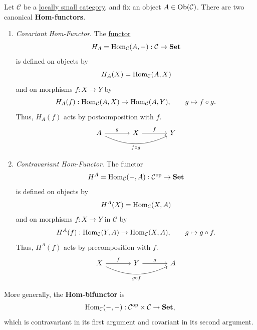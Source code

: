 	\begin{definition}
	  \label{def:hom-functors}
		Let $\mathcal C$ be a \hyperref[def:locally-small-category]{locally small category},
		and fix an object $A \in \operatorname{Ob}(\mathcal C)$.
		There are two canonical \textbf{Hom-functors}.
		\begin{enumerate}
			\item \textit{Covariant Hom-Functor}. The \hyperref[def:functor]{functor}
				\begin{equation}
					H_A = \operatorname{Hom}_{\mathcal C}(A,-):
					\mathcal C \to \operatorname{\mathbf{Set}}
				\end{equation}
				is defined on objects by
				\begin{equation}
					H_A(X) = \operatorname{Hom}_{\mathcal C}(A,X)
				\end{equation}
				and on morphisms $f: X \to Y$ by
				\begin{equation}
					H_A(f): \operatorname{Hom}_{\mathcal C}(A,X)
					\to \operatorname{Hom}_{\mathcal C}(A,Y),
					\qquad g \mapsto f \circ g.
				\end{equation}
				Thus, $H_A(f)$ acts by postcomposition with $f$.
				\begin{equation}
					\begin{tikzcd}[column sep=large]
						A \arrow[r, "g"]
							\arrow[rr, bend right=25, "f\circ g"'] &
						X \arrow[r, "f"] & Y
					\end{tikzcd}
				\end{equation}

			\item \textit{Contravariant Hom-Functor}. The functor
				\begin{equation}
					H^A = \operatorname{Hom}_{\mathcal C}(-,A):
					\mathcal C^{\mathrm{op}} \to \operatorname{\mathbf{Set}}
				\end{equation}
				is defined on objects by
				\begin{equation}
					H^A(X) = \operatorname{Hom}_{\mathcal C}(X,A)
				\end{equation}
				and on morphisms $f: X \to Y$ in $\mathcal C$ by
				\begin{equation}
					H^A(f): \operatorname{Hom}_{\mathcal C}(Y,A)
					\to \operatorname{Hom}_{\mathcal C}(X,A),
					\qquad g \mapsto g \circ f.
				\end{equation}
				Thus, $H^A(f)$ acts by precomposition with $f$.
				\begin{equation}
					\begin{tikzcd}[column sep=large]
						X \arrow[r, "f"]
							\arrow[rr, bend right=25, "g\circ f"'] &
						Y \arrow[r, "g"] & A
					\end{tikzcd}
				\end{equation}
		\end{enumerate}

		More generally, the \textbf{Hom-bifunctor} is
		\begin{equation}
			\operatorname{Hom}_{\mathcal C}(-,-):
			\mathcal C^{\mathrm{op}} \times \mathcal C
			\to \operatorname{\mathbf{Set}},
		\end{equation}
		which is contravariant in its first argument
		and covariant in its second argument.
	\end{definition}

